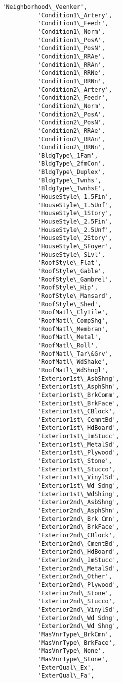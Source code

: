 \documentclass[11pt]{article}
\begin{document}
\begin{Verbatim}[commandchars=\\\{\}]
          'Neighborhood\_Veenker',
          'Condition1\_Artery',
          'Condition1\_Feedr',
          'Condition1\_Norm',
          'Condition1\_PosA',
          'Condition1\_PosN',
          'Condition1\_RRAe',
          'Condition1\_RRAn',
          'Condition1\_RRNe',
          'Condition1\_RRNn',
          'Condition2\_Artery',
          'Condition2\_Feedr',
          'Condition2\_Norm',
          'Condition2\_PosA',
          'Condition2\_PosN',
          'Condition2\_RRAe',
          'Condition2\_RRAn',
          'Condition2\_RRNn',
          'BldgType\_1Fam',
          'BldgType\_2fmCon',
          'BldgType\_Duplex',
          'BldgType\_Twnhs',
          'BldgType\_TwnhsE',
          'HouseStyle\_1.5Fin',
          'HouseStyle\_1.5Unf',
          'HouseStyle\_1Story',
          'HouseStyle\_2.5Fin',
          'HouseStyle\_2.5Unf',
          'HouseStyle\_2Story',
          'HouseStyle\_SFoyer',
          'HouseStyle\_SLvl',
          'RoofStyle\_Flat',
          'RoofStyle\_Gable',
          'RoofStyle\_Gambrel',
          'RoofStyle\_Hip',
          'RoofStyle\_Mansard',
          'RoofStyle\_Shed',
          'RoofMatl\_ClyTile',
          'RoofMatl\_CompShg',
          'RoofMatl\_Membran',
          'RoofMatl\_Metal',
          'RoofMatl\_Roll',
          'RoofMatl\_Tar\&Grv',
          'RoofMatl\_WdShake',
          'RoofMatl\_WdShngl',
          'Exterior1st\_AsbShng',
          'Exterior1st\_AsphShn',
          'Exterior1st\_BrkComm',
          'Exterior1st\_BrkFace',
          'Exterior1st\_CBlock',
          'Exterior1st\_CemntBd',
          'Exterior1st\_HdBoard',
          'Exterior1st\_ImStucc',
          'Exterior1st\_MetalSd',
          'Exterior1st\_Plywood',
          'Exterior1st\_Stone',
          'Exterior1st\_Stucco',
          'Exterior1st\_VinylSd',
          'Exterior1st\_Wd Sdng',
          'Exterior1st\_WdShing',
          'Exterior2nd\_AsbShng',
          'Exterior2nd\_AsphShn',
          'Exterior2nd\_Brk Cmn',
          'Exterior2nd\_BrkFace',
          'Exterior2nd\_CBlock',
          'Exterior2nd\_CmentBd',
          'Exterior2nd\_HdBoard',
          'Exterior2nd\_ImStucc',
          'Exterior2nd\_MetalSd',
          'Exterior2nd\_Other',
          'Exterior2nd\_Plywood',
          'Exterior2nd\_Stone',
          'Exterior2nd\_Stucco',
          'Exterior2nd\_VinylSd',
          'Exterior2nd\_Wd Sdng',
          'Exterior2nd\_Wd Shng',
          'MasVnrType\_BrkCmn',
          'MasVnrType\_BrkFace',
          'MasVnrType\_None',
          'MasVnrType\_Stone',
          'ExterQual\_Ex',
          'ExterQual\_Fa',

\end{Verbatim}
\end{document}

